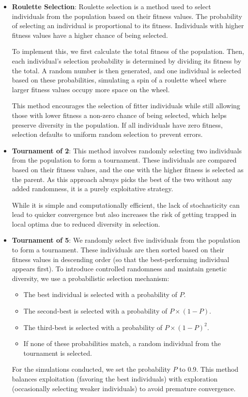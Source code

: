 \documentclass[a4paper, 12pt, fleqn]{report}
\begin{document}
\begin{itemize}
    \item \textbf{Roulette Selection}: Roulette selection is a method used to select individuals from the population based on their fitness values. The probability of selecting an individual is proportional to its fitness. Individuals with higher fitness values have a higher chance of being selected.

\noindent
To implement this, we first calculate the total fitness of the population. Then, each individual's selection probability is determined by dividing its fitness by the total. A random number is then generated, and one individual is selected based on these probabilities, simulating a spin of a roulette wheel where larger fitness values occupy more space on the wheel.

\noindent
This method encourages the selection of fitter individuals while still allowing those with lower fitness a non-zero chance of being selected, which helps preserve diversity in the population. If all individuals have zero fitness, selection defaults to uniform random selection to prevent errors.
    \item \textbf{Tournament of 2}: This method involves randomly selecting two individuals from the population to form a tournament. These individuals are compared based on their fitness values, and the one with the higher fitness is selected as the parent. As this approach always picks the best of the two without any added randomness, it is a purely exploitative strategy.

\noindent
While it is simple and computationally efficient, the lack of stochasticity can lead to quicker convergence but also increases the risk of getting trapped in local optima due to reduced diversity in selection.

    \item \textbf{Tournament of 5}: We randomly select five individuals from the population to form a tournament. These individuals are then sorted based on their fitness values in descending order (so that the best-performing individual appears first). To introduce controlled randomness and maintain genetic diversity, we use a probabilistic selection mechanism:

    \begin{itemize}
        \item The best individual is selected with a probability of \(P\).
        \item The second-best is selected with a probability of \(P \times (1 - P)\).
        \item The third-best is selected with a probability of \(P \times (1 - P)^2\).
        \item If none of these probabilities match, a random individual from the tournament is selected.
    \end{itemize}
\noindent
For the simulations conducted, we set the probability \(P\) to 0.9.
This method balances exploitation (favoring the best individuals) with exploration (occasionally selecting weaker individuals) to avoid premature convergence.
\end{itemize}
\end{document}
